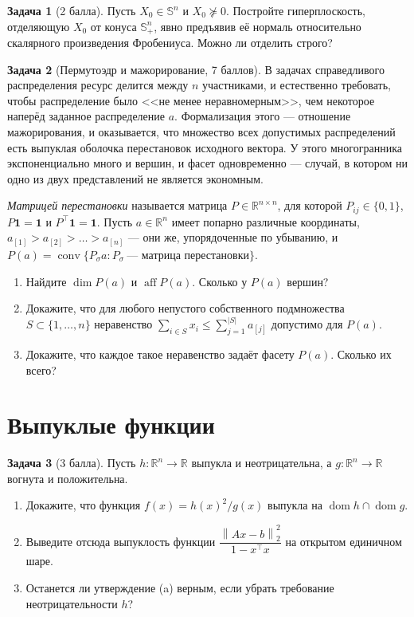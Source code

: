 \documentclass[11pt]{article}
\theoremstyle{definition}
\newtheorem{problem}{Задача}
\theoremstyle{remark}
\DeclareMathOperator{\conv}{conv}
\DeclareMathOperator{\aff}{aff}
\DeclareMathOperator{\dom}{dom}
\newcommand{\R}{\mathbb{R}}
\newcommand{\Sym}{\mathbb{S}}
\newcommand{\norm}[1]{\left\lVert #1 \right\rVert}
\newcommand{\ones}{\mathbf{1}}
\begin{document}
\begin{problem}[2 балла]
Пусть $X_0 \in \Sym^{n}$ и $X_0 \not\succeq 0$. Постройте гиперплоскость, отделяющую $X_0$ от
конуса $\Sym^{n}_{+}$, явно предъявив её нормаль относительно скалярного произведения Фробениуса.
Можно ли отделить строго?
\end{problem}

\begin{problem}[Пермутоэдр и мажорирование, 7 баллов]
В задачах справедливого распределения ресурс делится между $n$ участниками, и естественно требовать, чтобы распределение было <<не менее неравномерным>>, чем некоторое наперёд заданное распределение $a$. Формализация этого --- отношение мажорирования, и оказывается, что множество всех допустимых распределений есть выпуклая оболочка перестановок исходного вектора. У этого многогранника экспоненциально много и вершин, и фасет одновременно --- случай, в котором ни одно из двух представлений не является экономным.

\emph{Матрицей перестановки} называется матрица $P \in \R^{n \times n}$, для которой $P_{ij} \in \{0, 1\}$, $P \ones = \ones$ и $P^{\top} \ones = \ones$. Пусть $a \in \R^{n}$ имеет попарно различные координаты, $a_{[1]} > a_{[2]} > \dots > a_{[n]}$ --- они же, упорядоченные по убыванию, и $P(a) = \conv\{ P_\sigma a : P_\sigma \ \text{--- матрица перестановки}\}$.
\begin{enumerate}[label=(\alph*), nosep]
  \item Найдите $\dim P(a)$ и $\aff P(a)$. Сколько у $P(a)$ вершин?
  \item Докажите, что для любого непустого собственного подмножества $S \subset \{1, \dots, n\}$
        неравенство $\sum_{i \in S} x_i \le \sum_{j=1}^{|S|} a_{[j]}$ допустимо для $P(a)$.
  \item Докажите, что каждое такое неравенство задаёт фасету $P(a)$. Сколько их всего?
\end{enumerate}
\end{problem}

\section{Выпуклые функции}

\begin{problem}[3 балла]
Пусть $h \colon \R^{n} \to \R$ выпукла и неотрицательна, а $g \colon \R^{n} \to \R$ вогнута и положительна.
\begin{enumerate}[label=(\alph*), nosep]
  \item Докажите, что функция $f(x) = h(x)^{2} / g(x)$ выпукла на $\dom h \cap \dom g$.
  \item Выведите отсюда выпуклость функции
        $\dfrac{\norm{Ax - b}_2^{2}}{1 - x^{\top} x}$ на открытом единичном шаре.
  \item Останется ли утверждение (a) верным, если убрать требование неотрицательности $h$?
\end{enumerate}
\end{problem}
\end{document}
